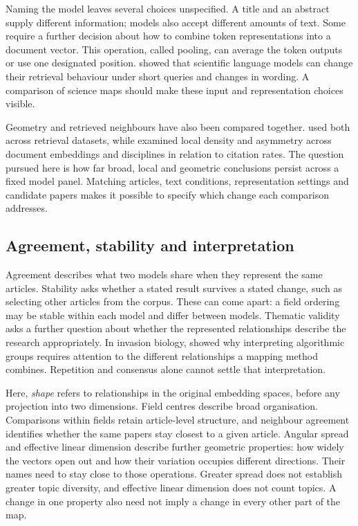\documentclass[12pt]{article}
\begin{document}
Naming the model leaves several choices unspecified. A title and an abstract supply different information; models also accept different amounts of text. Some require a further decision about how to combine token representations into a document vector. This operation, called pooling, can average the token outputs or use one designated position. \citet{singh-singh-2022-inefficiency} showed that scientific language models can change their retrieval behaviour under short queries and changes in wording. A comparison of science maps should make these input and representation choices visible.

Geometry and retrieved neighbours have also been compared together. \citet{ref4e1e0d5582} used both across retrieval datasets, while \citet{ref6da178065c} examined local density and asymmetry across document embeddings and disciplines in relation to citation rates. The question pursued here is how far broad, local and geometric conclusions persist across a fixed model panel. Matching articles, text conditions, representation settings and candidate papers makes it possible to specify which change each comparison addresses.

\subsection{Agreement, stability and interpretation}
Agreement describes what two models share when they represent the same articles. Stability asks whether a stated result survives a stated change, such as selecting other articles from the corpus. These can come apart: a field ordering may be stable within each model and differ between models. Thematic validity asks a further question about whether the represented relationships describe the research appropriately. In invasion biology, \citet{QSSreviewQ17} showed why interpreting algorithmic groups requires attention to the different relationships a mapping method combines. Repetition and consensus alone cannot settle that interpretation.

Here, \emph{shape} refers to relationships in the original embedding spaces, before any projection into two dimensions. Field centres describe broad organisation. Comparisons within fields retain article-level structure, and neighbour agreement identifies whether the same papers stay closest to a given article. Angular spread and effective linear dimension describe further geometric properties: how widely the vectors open out and how their variation occupies different directions. Their names need to stay close to those operations. Greater spread does not establish greater topic diversity, and effective linear dimension does not count topics. A change in one property also need not imply a change in every other part of the map.
\end{document}
